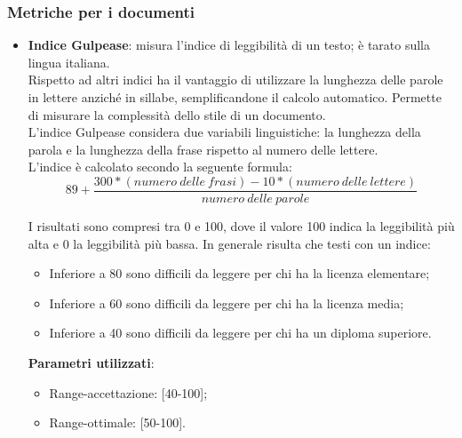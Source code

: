 {\subsubsection{Metriche per i documenti}{
	\label{sec:metricadocumenti}
	\begin{itemize}
		\item \textbf{Indice Gulpease}: misura l'indice di leggibilità di un testo; è tarato sulla lingua italiana.\\
		Rispetto ad altri indici ha il vantaggio di utilizzare la lunghezza delle parole in lettere anziché in sillabe, semplificandone il calcolo automatico. Permette di misurare la complessità dello stile di un documento.\\
		L'indice Gulpease considera due variabili linguistiche: la lunghezza della parola e la lunghezza della frase rispetto al numero delle lettere.\\
		L'indice è calcolato secondo la seguente formula:\\
		
		\[89 + \frac{300 *(numero\ delle\ frasi) -10 *(numero\ delle\ lettere)}{numero\ delle\ parole}\]
		
		I risultati sono compresi tra 0 e 100, dove il valore 100 indica la leggibilità più alta e 0 la leggibilità più bassa. In generale risulta che testi con un indice:
		
		\begin{itemize}
			\item Inferiore a 80 sono difficili da leggere per chi ha la licenza elementare;
			\item Inferiore a 60 sono difficili da leggere per chi ha la licenza media;
			\item Inferiore a 40 sono difficili da leggere per chi ha un diploma superiore.
		\end{itemize}
		
		\textbf{Parametri utilizzati}:
		\begin{itemize}
			\item Range-accettazione: [40-100];
			\item Range-ottimale: [50-100].
		\end{itemize}
	\end{itemize}
	}
}